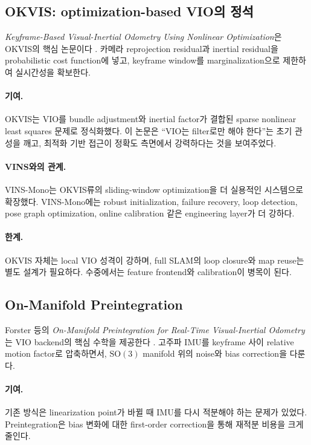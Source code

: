 \documentclass[11pt,a4paper]{article}
\newcommand{\SO}{\mathrm{SO}(3)}
\newcommand{\paper}[1]{\textit{#1}}
\begin{document}
\subsection{OKVIS: optimization-based VIO의 정석}

\paper{Keyframe-Based Visual-Inertial Odometry Using Nonlinear Optimization}은 OKVIS의 핵심 논문이다 \cite{leutenegger2015okvis}.
카메라 reprojection residual과 inertial residual을 probabilistic cost function에 넣고, keyframe window를 marginalization으로 제한하여 실시간성을 확보한다.

\paragraph{기여.}
OKVIS는 VIO를 bundle adjustment와 inertial factor가 결합된 sparse nonlinear least squares 문제로 정식화했다.
이 논문은 ``VIO는 filter로만 해야 한다''는 초기 관성을 깨고, 최적화 기반 접근이 정확도 측면에서 강력하다는 것을 보여주었다.

\paragraph{VINS와의 관계.}
VINS-Mono는 OKVIS류의 sliding-window optimization을 더 실용적인 시스템으로 확장했다.
VINS-Mono에는 robust initialization, failure recovery, loop detection, pose graph optimization, online calibration 같은 engineering layer가 더 강하다.

\paragraph{한계.}
OKVIS 자체는 local VIO 성격이 강하며, full SLAM의 loop closure와 map reuse는 별도 설계가 필요하다.
수중에서는 feature frontend와 calibration이 병목이 된다.

\subsection{On-Manifold Preintegration}

Forster 등의 \paper{On-Manifold Preintegration for Real-Time Visual-Inertial Odometry}는 VIO backend의 핵심 수학을 제공한다 \cite{forster2017preintegration}.
고주파 IMU를 keyframe 사이 relative motion factor로 압축하면서, \(\SO\) manifold 위의 noise와 bias correction을 다룬다.

\paragraph{기여.}
기존 방식은 linearization point가 바뀔 때 IMU를 다시 적분해야 하는 문제가 있었다.
Preintegration은 bias 변화에 대한 first-order correction을 통해 재적분 비용을 크게 줄인다.
\end{document}
